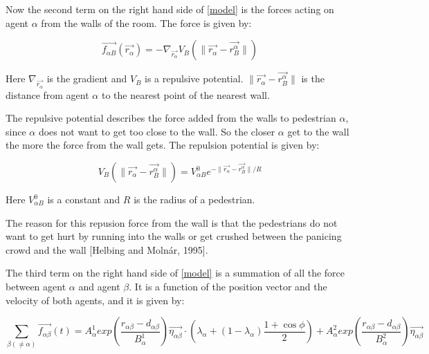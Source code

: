 Now the second term on the right hand side of \eqref{model} is the forces acting on agent 
$\alpha$ from the walls of the room. The force is given by:

\begin{equation}
    \vec{f_{\alpha B}} \left( \vec{r_{\alpha}} \right) =
    - \nabla_{\vec{r_{\alpha}}} V_{B}
    \left( \| \vec{r_{\alpha}} - \vec{r_{B}^{\alpha}} \| \right)
\end{equation}

Here $\nabla_{\vec{r_{\alpha}}}$ is the gradient and $V_B$ is a repulsive 
potential. $ \| \vec{r_{\alpha}} - \vec{r_{B}^{\alpha}} \|$ is the distance 
from agent $\alpha$ to the nearest point of the nearest wall.

The repulsive potential describes the force added from the walls to pedestrian $\alpha$, since $\alpha$ does not
want to get too close to the wall. So the closer $\alpha$ get to the wall the more the force from the wall gets.
The repulsion potential is given by:

\begin{equation}
V_{B} \left( \| \vec{r_{\alpha}} - \vec{r_{B}^{\alpha}} \| \right) =
V^0_{\alpha B} e^{- \| \vec{r_{\alpha}} - \vec{r_{B}^{\alpha}} \| / R }
\end{equation}

Here $V^0_{\alpha B}$ is a constant and $R$ is the radius of a pedestrian.

The reason for this repusion force from the wall is that the pedestrians do not want to get hurt by running into the walls
or get crushed between the panicing crowd and the wall [Helbing and Molnár, 1995].

The third term on the right hand side of \eqref{model} is a summation of all the 
force between agent $\alpha$ and agent $\beta$. It is a function of the position vector and the velocity of 
both agents, and it is given by:

\begin{equation}
    \sum_{\beta \left( \neq \alpha \right)}
        \vec{f_{\alpha \beta }}\left( t \right) =
        A_{\alpha}^{1} exp \left(
            \frac{ r_{\alpha \beta} - d_{\alpha \beta }}
                 {B_{\alpha}^1}
        \right)
    \vec{\eta_{\alpha \beta}} \cdot
    \left(
        \lambda_{\alpha} + \left(
            1 - \lambda_{\alpha}
        \right)
		\frac{1+\cos{\phi}}{2}
    \right) +
    A_{\alpha}^{2} exp\left(
        \frac{r_{\alpha \beta} - d_{\alpha \beta}}
             {B_{\alpha}^{2}}
    \right)
    \vec{\eta_{\alpha \beta}}
    \label{agentinteraction}
\end{equation}

